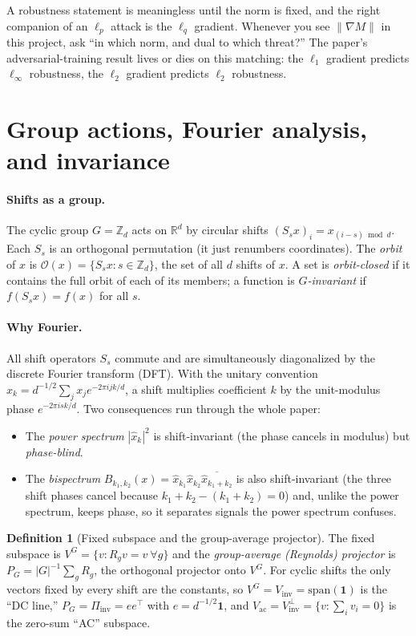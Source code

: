 \documentclass[11pt]{article}
\theoremstyle{plain}
\theoremstyle{definition}
\newtheorem{definition}[theorem]{Definition}
\theoremstyle{remark}
\newcommand{\researchmove}[2]{\par\smallskip\noindent{\color{movec}\rule{\linewidth}{0.4pt}}\par\nobreak
  \noindent{\color{movec}\textbf{Research move: #1}}\par\nobreak\noindent #2\par
  \noindent{\color{movec}\rule{\linewidth}{0.4pt}}\par\smallskip}
\newcommand{\R}{\mathbb{R}}
\newcommand{\Z}{\mathbb{Z}}
\newcommand{\Vinv}{V_{\mathrm{inv}}}
\newcommand{\Vac}{V_{\mathrm{ac}}}
\newcommand{\one}{\mathbf 1}
\newcommand{\Piinv}{\Pi_{\mathrm{inv}}}
\newcommand{\Orb}{\mathcal O}
\begin{document}
\researchmove{Match the dual to the threat}{A robustness statement is meaningless until the norm is fixed, and the
right companion of an $\ell_p$ attack is the $\ell_q$ gradient. Whenever you see $\|\nabla M\|$ in this project, ask
``in which norm, and dual to which threat?'' The paper's adversarial-training result lives or dies on this matching:
the $\ell_1$ gradient predicts $\ell_\infty$ robustness, the $\ell_2$ gradient predicts $\ell_2$ robustness.}

\section{Group actions, Fourier analysis, and invariance}\label{sec:group}

\paragraph{Shifts as a group.} The cyclic group $G=\Z_d$ acts on $\R^d$ by circular shifts $(S_sx)_i=x_{(i-s)\bmod d}$.
Each $S_s$ is an orthogonal permutation (it just renumbers coordinates). The \emph{orbit} of $x$ is
$\Orb(x)=\{S_sx:s\in\Z_d\}$, the set of all $d$ shifts of $x$. A set is \emph{orbit-closed} if it contains the full
orbit of each of its members; a function is \emph{$G$-invariant} if $f(S_sx)=f(x)$ for all $s$.

\paragraph{Why Fourier.} All shift operators $S_s$ commute and are simultaneously diagonalized by the discrete
Fourier transform (DFT). With the unitary convention $\hat x_k=d^{-1/2}\sum_j x_j e^{-2\pi ijk/d}$, a shift
multiplies coefficient $k$ by the unit-modulus phase $e^{-2\pi isk/d}$. Two consequences run through the whole paper:
\begin{itemize}[leftmargin=1.4em,nosep]
\item The \emph{power spectrum} $|\hat x_k|^2$ is shift-invariant (the phase cancels in modulus) but \emph{phase-blind}.
\item The \emph{bispectrum} $B_{k_1,k_2}(x)=\hat x_{k_1}\hat x_{k_2}\overline{\hat x_{k_1+k_2}}$ is also shift-invariant
(the three shift phases cancel because $k_1+k_2-(k_1+k_2)=0$) and, unlike the power spectrum, keeps phase, so it
separates signals the power spectrum confuses.
\end{itemize}

\begin{definition}[Fixed subspace and the group-average projector]
The fixed subspace is $V^G=\{v:R_gv=v\ \forall g\}$ and the \emph{group-average (Reynolds) projector} is
$P_G=|G|^{-1}\sum_g R_g$, the orthogonal projector onto $V^G$. For cyclic shifts the only vectors fixed by every
shift are the constants, so $V^G=\Vinv=\mathrm{span}(\one)$ is the ``DC line,'' $P_G=\Piinv=ee^\top$ with
$e=d^{-1/2}\one$, and $\Vac=\Vinv^\perp=\{v:\sum_i v_i=0\}$ is the zero-sum ``AC'' subspace.
\end{definition}
\end{document}
